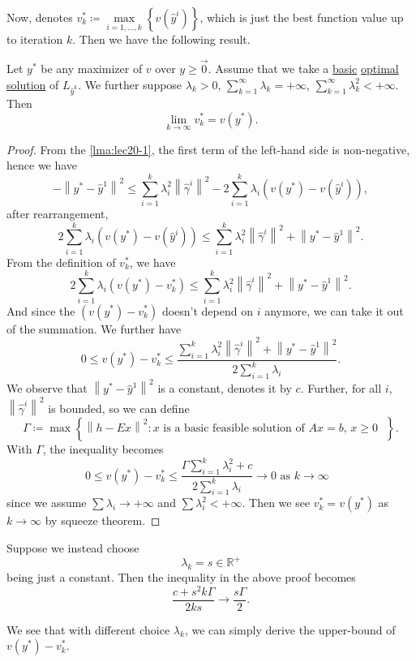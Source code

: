 Now, denotes \(v^{\ast}_{k}\coloneqq \max\limits_{i = 1, \ldots , k}\left\{v(\hat{y}^i)\right\}\), which is just the best function value
up to iteration \(k\). Then we have the following result.
\begin{theorem}\label{thm:lec20-1}
	Let \(y^{\ast}\) be any maximizer of \(v\) over \(y\geq \vec{0}\). Assume that we take a \hyperref[def:basic-solution]{basic} \hyperref[def:optimal-solution]{optimal solution}
	of \(L_{\hat{y}^k}\). We further suppose \(\lambda_{k}>0\), \(\sum\limits_{k=1}^{\infty} \lambda_{k} = +\infty \), \(\sum\limits_{k=1}^{\infty} \lambda_{k}^2< +\infty\). Then
	\[
		\lim_{k \to \infty} v^{\ast}_k = v(y^{\ast}).
	\]
\end{theorem}
\begin{proof}
	From the \autoref{lma:lec20-1}, the first term of the left-hand side is non-negative, hence we have
	\[
		- \left\lVert y^{\ast} - \hat{y}^1\right\rVert^2 \leq \sum\limits_{i=1}^{k} \lambda_{i}^{2}\left\lVert \hat{\gamma}^i\right\rVert^2 - 2 \sum\limits_{i=1}^{k} \lambda_{i}\left(v(y^{\ast}) - v(\hat{y}^i)\right),
	\]
	after rearrangement,
	\[
		2 \sum\limits_{i=1}^{k} \lambda_{i}\left(v(y^{\ast}) - v(\hat{y}^i)\right)\leq \sum\limits_{i=1}^{k} \lambda_{i}^{2}\left\lVert \hat{\gamma}^i\right\rVert^2 + \left\lVert y^{\ast} - \hat{y}^1\right\rVert^2.
	\]
	From the definition of \(v^{\ast}_{k}\), we have
	\[
		2 \sum\limits_{i=1}^{k} \lambda_{i}\left(v(y^{\ast}) - v^{\ast}_{k}\right)\leq \sum\limits_{i=1}^{k} \lambda_{i}^{2}\left\lVert \hat{\gamma}^i\right\rVert^2 + \left\lVert y^{\ast} - \hat{y}^1\right\rVert^2.
	\]
	And since the \(\left(v(y^{\ast}) - v^{\ast}_{k}\right)\) doesn't depend on \(i\) anymore, we can take it out of the summation. We further have
	\[
		0\leq v(y^{\ast}) - v^{\ast}_{k}\leq \frac{\sum\limits_{i=1}^{k} \lambda_{i}^{2}\left\lVert \hat{\gamma}^i\right\rVert^2 + \left\lVert y^{\ast} - \hat{y}^1\right\rVert^2}{2 \sum\limits_{i=1}^{k} \lambda_{i}}.
	\]
	We observe that \(\left\lVert y^{\ast} - \hat{y}^1\right\rVert^2 \) is a constant, denotes it by \(c\). Further, for all \(i\), \(\left\lVert \hat{\gamma}^i\right\rVert^2 \) is bounded, so we can define
	\[
		\Gamma\coloneqq \max\left\{\left\lVert h - Ex\right\rVert^2\colon \text{\(x\) is a basic feasible solution of \(Ax = b\), \(x\geq 0\)  }\right\}.
	\]
	With \(\Gamma\), the inequality becomes
	\[
		0\leq v(y^{\ast}) - v^{\ast}_{k}\leq \frac{\Gamma\sum\limits_{i=1}^{k} \lambda_{i}^{2} + c}{2 \sum\limits_{i=1}^{k} \lambda_{i}}\to 0 \text{ as \(k \to  \infty \) }
	\]
	since we assume \(\sum \lambda_{i} \to  +\infty \) and \(\sum\limits\lambda_{i}^{2}< +\infty  \). Then we see \(v^{\ast}_{k} = v(y^{\ast})\) as \(k \to \infty \) by squeeze theorem.
\end{proof}
\begin{remark}
	Suppose we instead choose
	\[
		\lambda_{k} = s\in\mathbb{R}^+
	\]
	being just a constant. Then the inequality in the above proof becomes
	\[
		\frac{c + s^2 k \Gamma }{2 k s}\to \frac{s \Gamma}{2}.
	\]

	We see that with different choice \(\lambda_{k}\), we can simply derive the upper-bound of \(v(y^{\ast}) - v^{\ast}_{k}\).
\end{remark}

